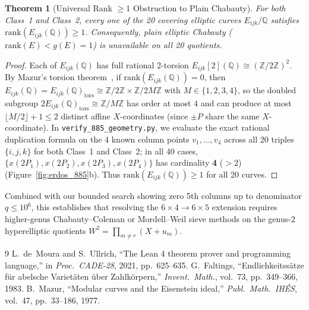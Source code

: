 \documentclass[10pt,twocolumn]{article}
\newtheorem{theorem}{Theorem}[section]
\theoremstyle{definition}
\begin{document}
\begin{theorem}[Universal Rank $\ge 1$ Obstruction to Plain Chabauty]
For both Class~1 and Class~2, every one of the 20 covering elliptic curves $E_{ijk}/\mathbb{Q}$ satisfies $\mathrm{rank}(E_{ijk}(\mathbb{Q})) \ge 1$. Consequently, plain elliptic Chabauty ($\mathrm{rank}(E) < g(E) = 1$) is unavailable on all 20 quotients.
\end{theorem}
\begin{proof}
Each of $E_{ijk}(\mathbb{Q})$ has full rational 2-torsion $E_{ijk}[2](\mathbb{Q}) \cong (\mathbb{Z}/2\mathbb{Z})^2$. By Mazur's torsion theorem~\cite{Mazur1977}, if $\mathrm{rank}(E_{ijk}(\mathbb{Q})) = 0$, then $E_{ijk}(\mathbb{Q}) = E_{ijk}(\mathbb{Q})_{\text{tors}} \cong \mathbb{Z}/2\mathbb{Z} \times \mathbb{Z}/2M\mathbb{Z}$ with $M \in \{1,2,3,4\}$, so the doubled subgroup $2E_{ijk}(\mathbb{Q})_{\text{tors}} \cong \mathbb{Z}/M\mathbb{Z}$ has order at most $4$ and can produce at most $\lfloor M/2 \rfloor + 1 \le 2$ distinct affine $X$-coordinates (since $\pm P$ share the same $X$-coordinate). In \texttt{verify\_885\_geometry.py}, we evaluate the exact rational duplication formula on the 4 known column points $v_1,\dots,v_4$ across all 20 triples $\{i,j,k\}$ for both Class~1 and Class~2; in all 40 cases, $\{x(2P_1), x(2P_2), x(2P_3), x(2P_4)\}$ has cardinality \textbf{4} ($> 2$) (Figure~\ref{fig:erdos_885}b). Thus $\mathrm{rank}(E_{ijk}(\mathbb{Q})) \ge 1$ for all 20 curves.
\end{proof}
Combined with our bounded search showing zero 5th columns up to denominator $q \le 10^6$, this establishes that resolving the $6 \times 4 \to 6 \times 5$ extension requires higher-genus Chabauty--Coleman or Mordell--Weil sieve methods on the genus-2 hyperelliptic quotients $W^2 = \prod_{m \neq r}(X + u_m)$.

\begin{thebibliography}{9}
\small
{}
L.~de~Moura and S.~Ullrich, ``The Lean 4 theorem prover and programming language,'' in \emph{Proc.\ CADE-28}, 2021, pp.~625--635.
G.~Faltings, ``Endlichkeitss\"atze f\"ur abelsche Variet\"aten \"uber Zahlk\"orpern,'' \emph{Invent.\ Math.}, vol.~73, pp.~349--366, 1983.
B.~Mazur, ``Modular curves and the Eisenstein ideal,'' \emph{Publ.\ Math.\ IH\'ES}, vol.~47, pp.~33--186, 1977.
\end{thebibliography}
\end{document}
